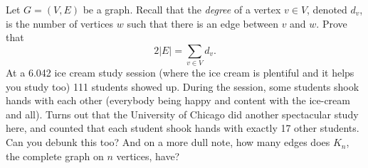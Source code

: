 \documentclass[12pt,twoside]{article} \usepackage{light}
\begin{document}
\begin{problem}{20}
Let $G = (V,E)$ be a graph. Recall that the {\em degree} of a vertex
$v \in V$, denoted $d_v$, is the number of vertices $w$ such that
there is an edge between $v$ and $w$.  \bparts {} Prove
that $$2|E| = \sum_{v\in V} d_v.$$ 
 At a 6.042 ice cream study session (where the ice cream is
plentiful and it helps you study too) 111 students showed up. During
the session, some students shook hands with each other (everybody
being happy and content with the ice-cream and all). Turns out that
the University of Chicago did another spectacular study here, and
counted that each student shook hands with exactly 17 other
students. Can you debunk this too?     And on
a more dull note, how many edges does $K_n$, the complete graph on $n$
vertices, have?    \eparts

\end{problem}
\end{document}
